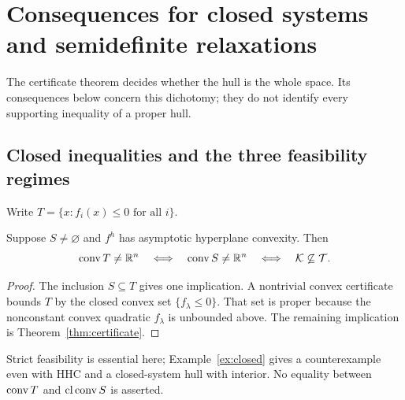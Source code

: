 \section{Consequences for closed systems and semidefinite relaxations}
\label{sec:consequences}

The certificate theorem decides whether the hull is the whole space.
Its consequences below concern this dichotomy; they do not identify
every supporting inequality of a proper hull.

\subsection{Closed inequalities and the three feasibility regimes}

Write $T=\{x:f_i(x)\leq0\text{ for all }i\}$.

\begin{corollary}\label{cor:closed}
Suppose $S\ne\varnothing$ and $f^h$ has asymptotic hyperplane convexity.
Then
\[
 \operatorname{conv} T\ne\mathbb R^n\quad\Longleftrightarrow\quad
 \operatorname{conv} S\ne\mathbb R^n\quad\Longleftrightarrow\quad
 \mathcal K\not\subseteq\mathcal T.
\]
\end{corollary}
\begin{proof}
The inclusion $S\subseteq T$ gives one implication. A nontrivial convex
certificate bounds $T$ by the closed convex set $\{f_\lambda\leq0\}$.
That set is proper because the nonconstant convex quadratic
$f_\lambda$ is unbounded above. The remaining implication is
Theorem~\ref{thm:certificate}.
\end{proof}

Strict feasibility is essential here; Example~\ref{ex:closed} gives a
counterexample even with HHC and a closed-system hull with interior.
No equality between $\operatorname{conv} T$ and $\operatorname{cl}\operatorname{conv} S$ is asserted.

